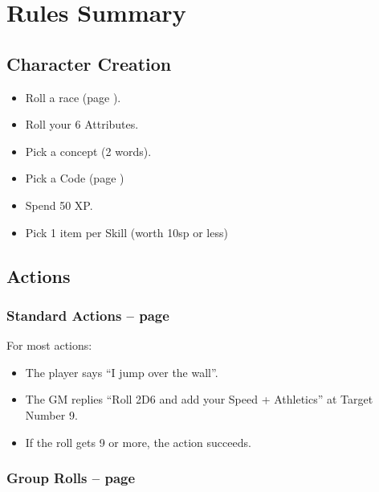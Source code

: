\section*{Rules Summary}

\begin{multicols}{2}

\subsection{Character Creation}

\begin{itemize}

  \item
  Roll a race (page \pageref{raceRoll}).
  \item
  Roll your 6 Attributes.
  \item
  Pick a concept (2 words).
  \item
  Pick a Code (page \pageref{gods_codes})
  \item
  Spend 50 XP.
  \item
  Pick 1 item per Skill (worth 10sp or less)

\end{itemize}

\subsection{Actions}

\subsubsection{Standard Actions -- page \pageref{basicaction}}

For most actions:

\begin{itemize}

  \item
  The player says ``I jump over the wall''.
  \item
  The GM replies ``Roll 2D6 and add your Speed + Athletics'' at Target Number 9.
  \item
  If the roll gets 9 or more, the action succeeds.

\end{itemize}

\subsubsection{Group Rolls -- page \pageref{grouproll}}


\end{multicols}
